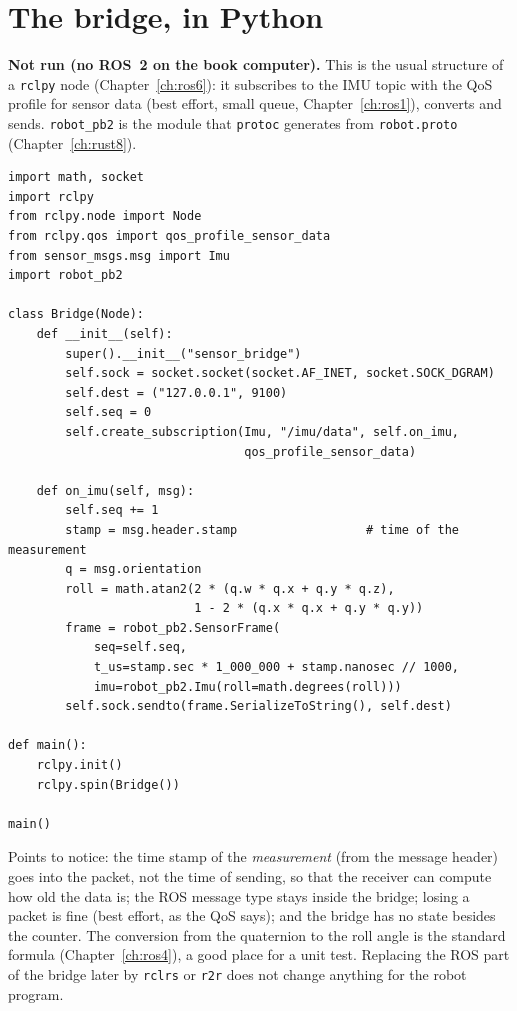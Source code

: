 \section*{The bridge, in Python}
\textbf{Not run (no ROS~2 on the book computer).} This is the usual structure of a \verb!rclpy! node (Chapter~\ref{ch:ros6}): it subscribes to the IMU topic with the QoS profile for sensor data (best effort, small queue, Chapter~\ref{ch:ros1}), converts and sends. \verb!robot_pb2! is the module that \verb!protoc! generates from \verb!robot.proto! (Chapter~\ref{ch:rust8}).
\begin{verbatim}
import math, socket
import rclpy
from rclpy.node import Node
from rclpy.qos import qos_profile_sensor_data
from sensor_msgs.msg import Imu
import robot_pb2

class Bridge(Node):
    def __init__(self):
        super().__init__("sensor_bridge")
        self.sock = socket.socket(socket.AF_INET, socket.SOCK_DGRAM)
        self.dest = ("127.0.0.1", 9100)
        self.seq = 0
        self.create_subscription(Imu, "/imu/data", self.on_imu,
                                 qos_profile_sensor_data)

    def on_imu(self, msg):
        self.seq += 1
        stamp = msg.header.stamp                  # time of the measurement
        q = msg.orientation
        roll = math.atan2(2 * (q.w * q.x + q.y * q.z),
                          1 - 2 * (q.x * q.x + q.y * q.y))
        frame = robot_pb2.SensorFrame(
            seq=self.seq,
            t_us=stamp.sec * 1_000_000 + stamp.nanosec // 1000,
            imu=robot_pb2.Imu(roll=math.degrees(roll)))
        self.sock.sendto(frame.SerializeToString(), self.dest)

def main():
    rclpy.init()
    rclpy.spin(Bridge())

main()
\end{verbatim}
Points to notice: the time stamp of the \emph{measurement} (from the message header) goes into the packet, not the time of sending, so that the receiver can compute how old the data is; the ROS message type stays inside the bridge; losing a packet is fine (best effort, as the QoS says); and the bridge has no state besides the counter. The conversion from the quaternion to the roll angle is the standard formula (Chapter~\ref{ch:ros4}), a good place for a unit test. Replacing the ROS part of the bridge later by \verb!rclrs! or \verb!r2r! does not change anything for the robot program.

